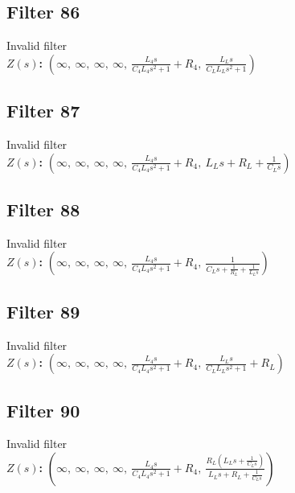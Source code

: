 \documentclass{article}
\begin{document}
\subsection*{Filter 86}
Invalid filter \\ 
\textbf{$Z(s)$:} $\left( \infty, \  \infty, \  \infty, \  \infty, \  \frac{L_{4} s}{C_{4} L_{4} s^{2} + 1} + R_{4}, \  \frac{L_{L} s}{C_{L} L_{L} s^{2} + 1}\right)$ \\ 
\subsection*{Filter 87}
Invalid filter \\ 
\textbf{$Z(s)$:} $\left( \infty, \  \infty, \  \infty, \  \infty, \  \frac{L_{4} s}{C_{4} L_{4} s^{2} + 1} + R_{4}, \  L_{L} s + R_{L} + \frac{1}{C_{L} s}\right)$ \\ 
\subsection*{Filter 88}
Invalid filter \\ 
\textbf{$Z(s)$:} $\left( \infty, \  \infty, \  \infty, \  \infty, \  \frac{L_{4} s}{C_{4} L_{4} s^{2} + 1} + R_{4}, \  \frac{1}{C_{L} s + \frac{1}{R_{L}} + \frac{1}{L_{L} s}}\right)$ \\ 
\subsection*{Filter 89}
Invalid filter \\ 
\textbf{$Z(s)$:} $\left( \infty, \  \infty, \  \infty, \  \infty, \  \frac{L_{4} s}{C_{4} L_{4} s^{2} + 1} + R_{4}, \  \frac{L_{L} s}{C_{L} L_{L} s^{2} + 1} + R_{L}\right)$ \\ 
\subsection*{Filter 90}
Invalid filter \\ 
\textbf{$Z(s)$:} $\left( \infty, \  \infty, \  \infty, \  \infty, \  \frac{L_{4} s}{C_{4} L_{4} s^{2} + 1} + R_{4}, \  \frac{R_{L} \left(L_{L} s + \frac{1}{C_{L} s}\right)}{L_{L} s + R_{L} + \frac{1}{C_{L} s}}\right)$ \\ 
\end{document}
